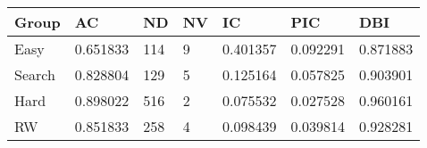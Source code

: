 \begin{tabular}{lllllll}
\hline
Group  & AC       & ND  & NV & IC       & PIC      & DBI      \\
\hline
Easy   & 0.651833 & 114 & 9  & 0.401357 & 0.092291 & 0.871883 \\
Search & 0.828804 & 129 & 5  & 0.125164 & 0.057825 & 0.903901 \\
Hard   & 0.898022 & 516 & 2  & 0.075532 & 0.027528 & 0.960161 \\
RW     & 0.851833 & 258 & 4  & 0.098439 & 0.039814 & 0.928281 \\
\hline
\end{tabular}